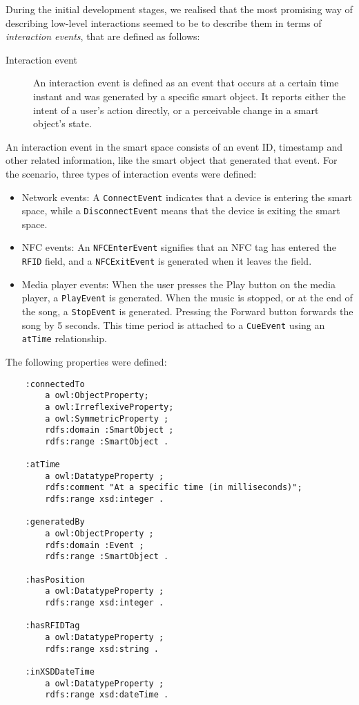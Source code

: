 During the initial development stages, we realised that the most promising way of describing low-level interactions seemed to be to describe them in terms of \emph{interaction events}, that are defined as follows:

\begin{description}
	\item [Interaction event] An interaction event is defined as an event that occurs at a certain time instant and was generated by a specific smart object. It reports either the intent of a user's action directly, or a perceivable change in a smart object's state.
\end{description}

An interaction event in the smart space consists of an event ID, timestamp and other related information, like the smart object that generated that event. For the scenario, three types of interaction events were defined:

\begin{itemize}
	\item Network events: A \texttt{ConnectEvent} indicates that a device is entering the smart space, while a \texttt{DisconnectEvent} means that the device is exiting the smart space. 
	\item \ac{NFC} events: An \texttt{NFCEnterEvent} signifies that an \ac{NFC} tag has entered the \texttt{RFID} field, and a \texttt{NFCExitEvent} is generated when it leaves the field.
	\item Media player events: When the user presses the Play button on the media player, a \texttt{PlayEvent} is generated. When the music is stopped, or at the end of the song, a \texttt{StopEvent} is generated. Pressing the Forward button forwards the song by 5 seconds. This time period is attached to a \texttt{CueEvent} using an \texttt{atTime} relationship.
\end{itemize}

The following properties were defined:

\begin{verbatim}
	:connectedTo
	    a owl:ObjectProperty;
	    a owl:IrreflexiveProperty;
	    a owl:SymmetricProperty ;
	    rdfs:domain :SmartObject ;
	    rdfs:range :SmartObject .

	:atTime
	    a owl:DatatypeProperty ;
	    rdfs:comment "At a specific time (in milliseconds)";
	    rdfs:range xsd:integer .

	:generatedBy
	    a owl:ObjectProperty ;
	    rdfs:domain :Event ;
	    rdfs:range :SmartObject .

	:hasPosition
	    a owl:DatatypeProperty ;
	    rdfs:range xsd:integer .

	:hasRFIDTag
	    a owl:DatatypeProperty ;
	    rdfs:range xsd:string .

	:inXSDDateTime
	    a owl:DatatypeProperty ;
	    rdfs:range xsd:dateTime .
\end{verbatim}


